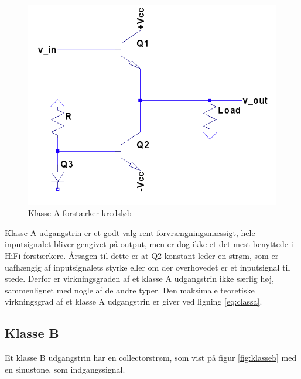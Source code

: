 \begin{figure}[h]
\centering
\includegraphics[scale=.35]{indledende_analyse/klasser/classa.png}
\caption{Klasse A forstærker kredsløb}
\label{fig:classa}
\end{figure}

Klasse A udgangstrin er et godt valg rent forvrængningsmæssigt, hele inputsignalet bliver gengivet på output, men er dog ikke et det mest benyttede i HiFi-forstærkere. Årsagen til dette er at Q2 konstant leder en strøm, som er uafhængig af inputsignalets styrke eller om der overhovedet er et inputsignal til stede. Derfor er virkningsgraden af et klasse A udgangstrin ikke særlig høj, sammenlignet med nogle af de andre typer. Den maksimale teoretiske virkningsgrad af et klasse A udgangstrin er giver ved ligning \ref{eq:classa}.

\subsection{Klasse B}

Et klasse B udgangstrin har en collectorstrøm, som vist på figur \ref{fig:klasseb} med en sinustone, som indgangssignal. 

